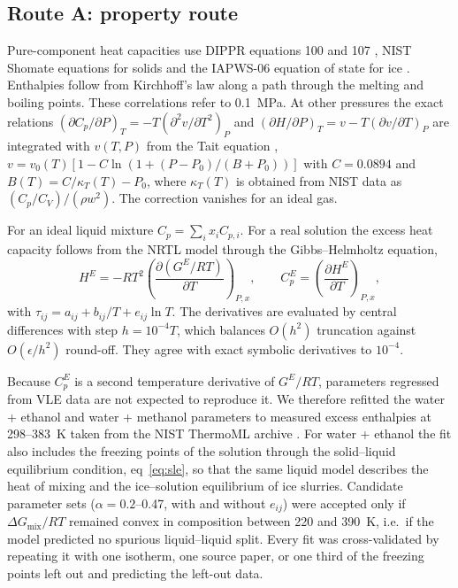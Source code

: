 \documentclass[journal=jceaax,manuscript=article,layout=twocolumn]{achemso}
\begin{document}
\subsection{Route A: property route}
Pure-component heat capacities use DIPPR equations 100 and 107 \cite{Perry2008}, NIST Shomate equations
for solids \cite{NISTWebBook} and the IAPWS-06 equation of state for ice \cite{Feistel2006,IAPWS2009}.
Enthalpies follow from Kirchhoff's law along a path through the melting and boiling points.
These correlations refer to 0.1~MPa. At other pressures the exact relations
$(\partial C_p/\partial P)_T=-T(\partial^2 v/\partial T^2)_P$ and $(\partial H/\partial P)_T=v-T(\partial v/\partial T)_P$
are integrated with $v(T,P)$ from the Tait equation \cite{Dymond1988},
$v=v_0(T)[1-C\ln(1+(P-P_0)/(B+P_0))]$ with $C=0.0894$ and $B(T)=C/\kappa_T(T)-P_0$, where $\kappa_T(T)$
is obtained from NIST data as $(C_p/C_V)/(\rho w^2)$. The correction vanishes for an ideal gas.

For an ideal liquid mixture $C_p=\sum_i x_iC_{p,i}$. For a real solution the excess heat capacity
follows from the NRTL model \cite{Renon1968} through the Gibbs--Helmholtz equation,
\begin{equation}
H^E=-RT^2\left(\frac{\partial (G^E/RT)}{\partial T}\right)_{P,x},\qquad
C_p^E=\left(\frac{\partial H^E}{\partial T}\right)_{P,x},
\end{equation}
with $\tau_{ij}=a_{ij}+b_{ij}/T+e_{ij}\ln T$. The derivatives are evaluated by central differences with
step $h=10^{-4}T$, which balances $O(h^2)$ truncation against $O(\epsilon/h^2)$ round-off. They agree with
exact symbolic derivatives to $10^{-4}$.

Because $C_p^E$ is a second temperature derivative of $G^E/RT$, parameters regressed from VLE data are
not expected to reproduce it. We therefore refitted the water + ethanol and water + methanol parameters
to measured excess enthalpies at 298--383~K \cite{Nagamachi2006,Brandt2014,Modaresifar2017,Dettmann2006,Behbehani2006}
taken from the NIST ThermoML archive \cite{ThermoMLArchive}. For water + ethanol the fit also includes
the freezing points of the solution \cite{Lange1967} through the solid--liquid equilibrium condition,
eq~\ref{eq:sle}, so that the same liquid model describes the heat of mixing and the ice--solution equilibrium of
ice slurries. Candidate parameter sets ($\alpha = 0.2$--0.47, with and without $e_{ij}$) were accepted only if
$\Delta G_\mathrm{mix}/RT$ remained convex in composition between 220 and 390~K, i.e.\ if the model
predicted no spurious liquid--liquid split. Every fit was cross-validated by repeating it with one
isotherm, one source paper, or one third of the freezing points left out and predicting the left-out data.
\end{document}
